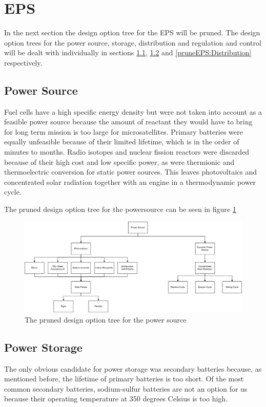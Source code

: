 \section{\acl{EPS}}
\label{pruneEPS}
In the next section the design option tree for the \ac{EPS} will be pruned. The design option trees for the power source, storage, distribution and regulation and control will be dealt with individually in sections \ref{pruneEPS:Source}, \ref{pruneEPS:Storage} and \ref{pruneEPS:Distribution} respectively.

\subsection{Power Source}
\label{pruneEPS:Source}
Fuel cells have a high specific energy density but were not taken into account as a feasible power source because the amount of reactant they would have to bring for long term mission is too large for microsatellites. Primary batteries were equally unfeasible because of their limited lifetime, which is in the order of minutes to months. Radio isotopes and nuclear fission reactors were discarded because of their high cost and low specific power, as were thermionic and thermoelectric conversion for static power sources.
This leaves photovoltaics and concentrated solar radiation together with an engine in a thermodynamic power cycle.

The pruned design option tree for the powersource can be seen in figure \ref{fig:DOTeps_sourcePruned}

\begin{figure}
\includegraphics{chapters/img/DOTeps_sourcePruned.png}
\caption{The pruned design option tree for the power source}
\label{fig:DOTeps_sourcePruned}
\end{figure}

\subsection{Power Storage}
\label{pruneEPS:Storage}
The only obvious candidate for power storage was secondary batteries because, as mentioned before, the lifetime of primary batteries is too short.
Of the most common secondary batteries, sodium-sulfur batteries are not an option for us because their operating temperature at 350 degrees Celsius is too high.

